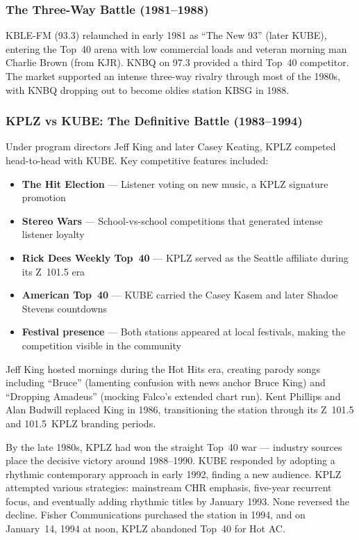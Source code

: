 \documentclass[11pt,letterpaper]{article}
\begin{document}
\subsubsection{The Three-Way Battle (1981--1988)}

KBLE-FM (93.3) relaunched in early 1981 as ``The New 93'' (later KUBE), entering the Top~40 arena with low commercial loads and veteran morning man Charlie Brown (from KJR). KNBQ on 97.3 provided a third Top~40 competitor. The market supported an intense three-way rivalry through most of the 1980s, with KNBQ dropping out to become oldies station KBSG in 1988.

\subsubsection{KPLZ vs KUBE: The Definitive Battle (1983--1994)}

Under program directors Jeff King and later Casey Keating, KPLZ competed head-to-head with KUBE. Key competitive features included:

\begin{itemize}[leftmargin=2em]
\item \textbf{The Hit Election} --- Listener voting on new music, a KPLZ signature promotion
\item \textbf{Stereo Wars} --- School-vs-school competitions that generated intense listener loyalty
\item \textbf{Rick Dees Weekly Top~40} --- KPLZ served as the Seattle affiliate during its Z~101.5 era
\item \textbf{American Top~40} --- KUBE carried the Casey Kasem and later Shadoe Stevens countdowns
\item \textbf{Festival presence} --- Both stations appeared at local festivals, making the competition visible in the community
\end{itemize}

Jeff King hosted mornings during the Hot Hits era, creating parody songs including ``Bruce'' (lamenting confusion with news anchor Bruce King) and ``Dropping Amadeus'' (mocking Falco's extended chart run). Kent Phillips and Alan Budwill replaced King in 1986, transitioning the station through its Z~101.5 and 101.5~KPLZ branding periods.

By the late 1980s, KPLZ had won the straight Top~40 war --- industry sources place the decisive victory around 1988--1990. KUBE responded by adopting a rhythmic contemporary approach in early 1992, finding a new audience. KPLZ attempted various strategies: mainstream CHR emphasis, five-year recurrent focus, and eventually adding rhythmic titles by January 1993. None reversed the decline. Fisher Communications purchased the station in 1994, and on January~14, 1994 at noon, KPLZ abandoned Top~40 for Hot AC.
\end{document}
